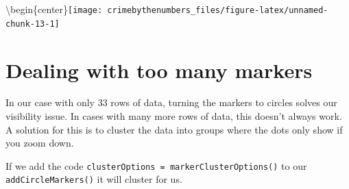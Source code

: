 \documentclass[
]{krantz}
\makeatletter
\newenvironment{Shaded}{\begin{snugshade}}{\end{snugshade}}
\newcommand{\AttributeTok}[1]{\textcolor[rgb]{0.61,0.61,0.61}{#1}}
\newcommand{\DecValTok}[1]{\textcolor[rgb]{0.06,0.06,0.06}{#1}}
\newcommand{\FunctionTok}[1]{\textcolor[rgb]{0,0,0}{#1}}
\newcommand{\NormalTok}[1]{#1}
\newcommand{\SpecialCharTok}[1]{\textcolor[rgb]{0,0,0}{#1}}
\newcommand{\StringTok}[1]{\textcolor[rgb]{0.5,0.5,0.5}{#1}}
\newenvironment{kframe}{%
\medskip{}
\setlength{\fboxsep}{.8em}
 \def\at@end@of@kframe{}%
 \ifinner\ifhmode%
  \def\at@end@of@kframe{\end{minipage}}%
  \begin{minipage}{\columnwidth}%
 \fi\fi%
 \def\FrameCommand##1{\hskip\@totalleftmargin \hskip-\fboxsep
 \colorbox{shadecolor}{##1}\hskip-\fboxsep
     \hskip-\linewidth \hskip-\@totalleftmargin \hskip\columnwidth}%
 \MakeFramed {\advance\hsize-\width
   \@totalleftmargin\z@ \linewidth\hsize
   \@setminipage}}%
 {\par\unskip\endMakeFramed%
 \at@end@of@kframe}
\renewenvironment{Shaded}{\begin{kframe}}{\end{kframe}}
\makeatother
\begin{document}
\begin{Shaded}
\end{Shaded}

\textbackslash begin\{center\}\texttt{[image: crimebythenumbers\_files/figure-latex/unnamed-chunk-13-1]}

\hypertarget{dealing-with-too-many-markers}{%
\section{Dealing with too many markers}\label{dealing-with-too-many-markers}}

In our case with only 33 rows of data, turning the markers to circles solves our visibility issue. In cases with many more rows of data, this doesn't always work. A solution for this is to cluster the data into groups where the dots only show if you zoom down.

If we add the code \texttt{clusterOptions\ =\ markerClusterOptions()} to our \texttt{addCircleMarkers()} it will cluster for us.
\end{document}
